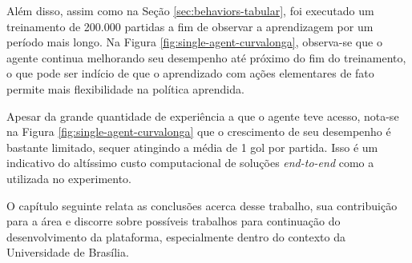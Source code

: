 Além disso, assim como na Seção \ref{sec:behaviors-tabular}, foi executado um treinamento de 200.000 partidas a fim de observar a aprendizagem por um período mais longo. Na Figura \ref{fig:single-agent-curvalonga}, observa-se que o agente continua melhorando seu desempenho até próximo do fim do treinamento, o que pode ser indício de que o aprendizado com ações elementares de fato permite mais flexibilidade na política aprendida.

Apesar da grande quantidade de experiência a que o agente teve acesso, nota-se na Figura \ref{fig:single-agent-curvalonga} que o crescimento de seu desempenho é bastante limitado, sequer atingindo a média de 1 gol por partida. Isso é um indicativo do altíssimo custo computacional de soluções \textit{end-to-end} como a utilizada no experimento.

O capítulo seguinte relata as conclusões acerca desse trabalho, sua contribuição para a área e discorre sobre possíveis trabalhos para continuação do desenvolvimento da plataforma, especialmente dentro do contexto da Universidade de Brasília.


 


